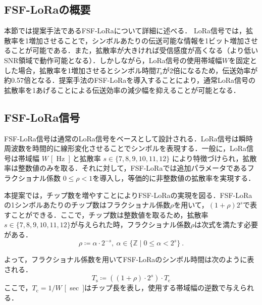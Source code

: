 \documentclass[technicalreport]{ieicej}
\begin{document}
\subsection{FSF-LoRaの概要}\label{sec:FSF}
本節では提案手法であるFSF-LoRaについて詳細に述べる．
LoRa信号では，拡散率を1増加させることで，シンボルあたりの伝送可能な情報を1ビット増加させることが可能である．また，拡散率が大きければ受信感度が高くなる（より低いSNR領域で動作可能となる）．しかしながら，LoRa信号の使用帯域幅$W$を固定とした場合，拡散率を1増加させるとシンボル時間$T_\mathrm{s}$が2倍になるため，伝送効率が約0.57倍となる．提案手法のFSF-LoRaを導入することにより，通常LoRa信号の拡散率を1あげることによる伝送効率の減少幅を抑えることが可能となる．



\subsection{FSF-LoRa信号}
FSF-LoRa信号は通常のLoRa信号をベースとして設計される．LoRa信号は瞬時周波数を時間的に線形変化させることでシンボルを表現する．一般に，LoRa信号は帯域幅 $W$ \si{[Hz]} と拡散率 $s\in\{7,8,9,10,11,12\}$ により特徴づけられ，拡散率は整数値のみを取る．それに対して，FSF-LoRaでは追加パラメータであるフラクショナル係数 $0\le\rho <1$を導入し，等価的に非整数値の拡散率を実現する．


本提案では，チップ数を増やすことによりFSF-LoRaの実現を図る．FSF-LoRaの1シンボルあたりのチップ数はフラクショナル係数$ \rho $を用いて，$(1+\rho)2^s$で表すことができる．ここで，チップ数は整数値を取るため，拡散率$s\in\{7,8,9,10,11,12\}$が与えられた時，フラクショナル係数$\rho$は次式を満たす必要がある．
\begin{equation}
\rho\coloneqq\alpha\cdot 2^{-s},\ \alpha\in \{\mathbb{Z}\mid 0\le \alpha <2^s\}\ .   
\end{equation}

よって，フラクショナル係数を用いてFSF-LoRaのシンボル時間は次のように表される．
\begin{equation}
    T_\mathrm{s}\coloneqq\left((1+\rho)\cdot 2^s\right)\cdot T_\mathrm{c}
\end{equation}
ここで，$T_\mathrm{c}=1/W$ \si{[sec]}はチップ長を表し，使用する帯域幅の逆数で与えられる．
\end{document}
